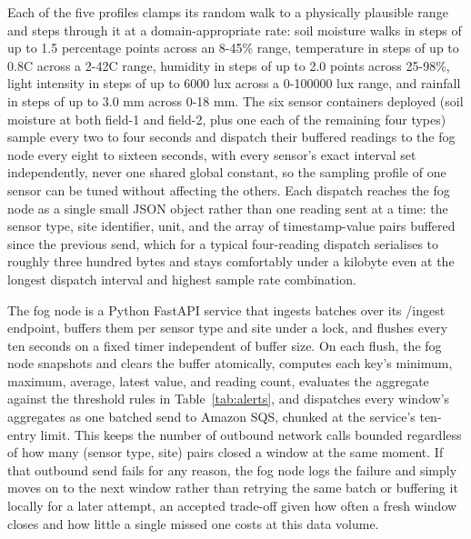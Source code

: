 \documentclass[conference]{IEEEtran}
\begin{document}
Each of the five profiles clamps its random walk to a physically plausible range and steps through it at a domain-appropriate rate: soil moisture walks in steps of up to 1.5 percentage points across an 8-45\% range, temperature in steps of up to 0.8\textdegree{}C across a 2-42\textdegree{}C range, humidity in steps of up to 2.0 points across 25-98\%, light intensity in steps of up to 6000 lux across a 0-100000 lux range, and rainfall in steps of up to 3.0 mm across 0-18 mm. The six sensor containers deployed (soil moisture at both field-1 and field-2, plus one each of the remaining four types) sample every two to four seconds and dispatch their buffered readings to the fog node every eight to sixteen seconds, with every sensor's exact interval set independently, never one shared global constant, so the sampling profile of one sensor can be tuned without affecting the others. Each dispatch reaches the fog node as a single small JSON object rather than one reading sent at a time: the sensor type, site identifier, unit, and the array of timestamp-value pairs buffered since the previous send, which for a typical four-reading dispatch serialises to roughly three hundred bytes and stays comfortably under a kilobyte even at the longest dispatch interval and highest sample rate combination.

The fog node is a Python FastAPI service that ingests batches over its /ingest endpoint, buffers them per sensor type and site under a lock, and flushes every ten seconds on a fixed timer independent of buffer size. On each flush, the fog node snapshots and clears the buffer atomically, computes each key's minimum, maximum, average, latest value, and reading count, evaluates the aggregate against the threshold rules in Table~\ref{tab:alerts}, and dispatches every window's aggregates as one batched send to Amazon SQS, chunked at the service's ten-entry limit. This keeps the number of outbound network calls bounded regardless of how many (sensor type, site) pairs closed a window at the same moment. If that outbound send fails for any reason, the fog node logs the failure and simply moves on to the next window rather than retrying the same batch or buffering it locally for a later attempt, an accepted trade-off given how often a fresh window closes and how little a single missed one costs at this data volume.
\end{document}
